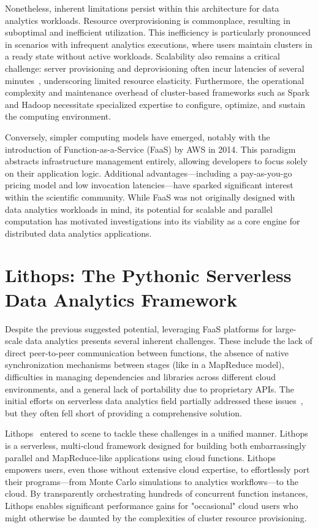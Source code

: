 Nonetheless, inherent limitations persist within this architecture for data analytics workloads. Resource overprovisioning is commonplace, resulting in suboptimal and inefficient utilization. This inefficiency is particularly pronounced in scenarios with infrequent analytics executions, where users maintain clusters in a ready state without active workloads. Scalability also remains a critical challenge: server provisioning and deprovisioning often incur latencies of several minutes~\citep{burst}, underscoring limited resource elasticity. Furthermore, the operational complexity and maintenance overhead of cluster-based frameworks such as Spark and Hadoop necessitate specialized expertise to configure, optimize, and sustain the computing environment.

Conversely, simpler computing models have emerged, notably with the introduction of Function-as-a-Service (FaaS) by AWS in 2014. This paradigm abstracts infrastructure management entirely, allowing developers to focus solely on their application logic. Additional advantages—including a pay-as-you-go pricing model and low invocation latencies—have sparked significant interest within the scientific community. While FaaS was not originally designed with data analytics workloads in mind, its potential for scalable and parallel computation has motivated investigations into its viability as a core engine for distributed data analytics applications.

\section{Lithops: The Pythonic Serverless Data Analytics Framework}
Despite the previous suggested potential, leveraging FaaS platforms for large-scale data analytics presents several inherent challenges. These include the lack of direct peer-to-peer communication between functions, the absence of native synchronization mechanisms between stages (like in a MapReduce model), difficulties in managing dependencies and libraries across different cloud environments, and a general lack of portability due to proprietary APIs. The initial efforts on serverless data analytics field partially addressed these issues~\citep{pywren}, but they often fell short of providing a comprehensive solution.

Lithops~\citep{lithops} entered to scene to tackle these challenges in a unified manner. Lithops is a serverless, multi-cloud framework designed for building both embarrassingly parallel and MapReduce-like applications using cloud functions. Lithops empowers users, even those without extensive cloud expertise, to effortlessly port their programs—from Monte Carlo simulations to analytics workflows—to the cloud. By transparently orchestrating hundreds of concurrent function instances, Lithops enables significant performance gains for "occasional" cloud users who might otherwise be daunted by the complexities of cluster resource provisioning.

